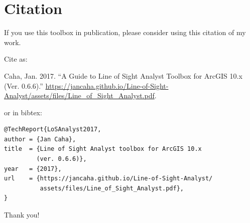 \documentclass[]{article}
\begin{document}
\section{Citation}

If you use this toolbox in publication, please consider using this citation of my work. 
\vspace{1em}

\noindent Cite as:
\vspace{1em}

\noindent Caha, Jan. 2017. “A Guide to Line of Sight Analyst Toolbox for ArcGIS 10.x (Ver. 0.6.6).”  \url{https://jancaha.github.io/Line-of-Sight-Analyst/assets/files/Line\_of\_Sight\_Analyst.pdf}.
\vspace{1em}

\noindent or in bibtex:
\vspace{1em}
\begin{lstlisting}
@TechReport{LoSAnalyst2017,
author = {Jan Caha},
title  = {Line of Sight Analyst toolbox for ArcGIS 10.x
         (ver. 0.6.6)},
year   = {2017},
url    = {https://jancaha.github.io/Line-of-Sight-Analyst/
          assets/files/Line_of_Sight_Analyst.pdf},
}
\end{lstlisting}

\vspace{1em}

\noindent Thank you!


\end{document}
